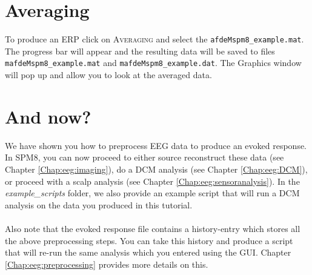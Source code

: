 \section{Averaging}
To produce an ERP click on \textsc{Averaging} and select the \texttt{afdeMspm8\_example.mat}. The progress bar will appear and the resulting data will be saved to files \texttt{mafdeMspm8\_example.mat} and \texttt{mafdeMspm8\_example.dat}. The Graphics window will pop up and allow you to look at the averaged data.

\section{And now?}
We have shown you how to preprocess EEG data to produce an evoked response. In SPM8, you can now proceed to either source reconstruct these data (see Chapter \ref{Chap:eeg:imaging}), do a DCM analysis (see Chapter \ref{Chap:eeg:DCM}), or proceed with a scalp analysis (see Chapter \ref{Chap:eeg:sensoranalysis}). In the \textit{example\_scripts} folder, we also provide an example script that will run a DCM analysis on the data you produced in this tutorial.
\\
\\
Also note that the evoked response file contains a history-entry which stores all the above preprocessing steps. You can take this history and produce a script that will re-run the same analysis which you entered using the GUI. Chapter \ref{Chap:eeg:preprocessing} provides more details on this.

